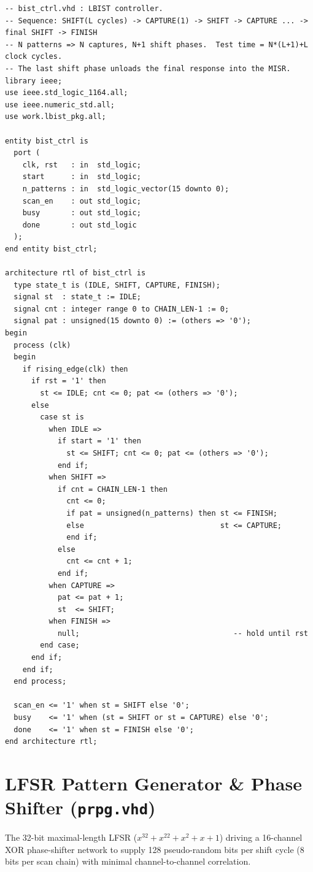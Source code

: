 \documentclass[conference]{IEEEtran}
\begin{document}
\begin{lstlisting}[style=vhdlstyle, caption={STUMPS LBIST FSM Controller (\texttt{bist\_ctrl.vhd})}]
-- bist_ctrl.vhd : LBIST controller.
-- Sequence: SHIFT(L cycles) -> CAPTURE(1) -> SHIFT -> CAPTURE ... -> final SHIFT -> FINISH
-- N patterns => N captures, N+1 shift phases.  Test time = N*(L+1)+L clock cycles.
-- The last shift phase unloads the final response into the MISR.
library ieee;
use ieee.std_logic_1164.all;
use ieee.numeric_std.all;
use work.lbist_pkg.all;

entity bist_ctrl is
  port (
    clk, rst   : in  std_logic;
    start      : in  std_logic;
    n_patterns : in  std_logic_vector(15 downto 0);
    scan_en    : out std_logic;
    busy       : out std_logic;
    done       : out std_logic
  );
end entity bist_ctrl;

architecture rtl of bist_ctrl is
  type state_t is (IDLE, SHIFT, CAPTURE, FINISH);
  signal st  : state_t := IDLE;
  signal cnt : integer range 0 to CHAIN_LEN-1 := 0;
  signal pat : unsigned(15 downto 0) := (others => '0');
begin
  process (clk)
  begin
    if rising_edge(clk) then
      if rst = '1' then
        st <= IDLE; cnt <= 0; pat <= (others => '0');
      else
        case st is
          when IDLE =>
            if start = '1' then
              st <= SHIFT; cnt <= 0; pat <= (others => '0');
            end if;
          when SHIFT =>
            if cnt = CHAIN_LEN-1 then
              cnt <= 0;
              if pat = unsigned(n_patterns) then st <= FINISH;
              else                               st <= CAPTURE;
              end if;
            else
              cnt <= cnt + 1;
            end if;
          when CAPTURE =>
            pat <= pat + 1;
            st  <= SHIFT;
          when FINISH =>
            null;                                   -- hold until rst
        end case;
      end if;
    end if;
  end process;

  scan_en <= '1' when st = SHIFT else '0';
  busy    <= '1' when (st = SHIFT or st = CAPTURE) else '0';
  done    <= '1' when st = FINISH else '0';
end architecture rtl;
\end{lstlisting}

\section{LFSR Pattern Generator \& Phase Shifter (\texttt{prpg.vhd})}
\label{app:prpg}
The 32-bit maximal-length LFSR ($x^{32} + x^{22} + x^2 + x + 1$) driving a 16-channel XOR phase-shifter network to supply 128 pseudo-random bits per shift cycle ($8$ bits per scan chain) with minimal channel-to-channel correlation.
\end{document}
